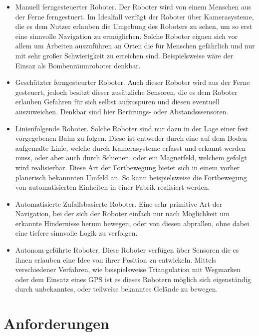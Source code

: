 \begin{itemize}
  \item Manuell ferngesteuerter Roboter. Der Roboter wird von einem Menschen aus der Ferne ferngestuert. Im Idealfall verf\"ugt der Roboter \"uber Kamerasysteme, die es dem Nutzer erlauben die Umgebung des Roboters zu sehen, um so erst eine sinnvolle Navigation zu erm\"oglichen. Solche Roboter eignen sich vor allem um Arbeiten auszuf\"uhren an Orten die f\"ur Menschen gef\"ahrlich und nur mit sehr großer Schwierigkeit zu erreichen sind. Beispielsweise w\"are der Einsaz als Bombenr\"aumroboter denkbar.
  \item Gesch\"utzter ferngesteurter Roboter. Auch dieser Roboter wird aus der Ferne gesteuert, jedoch besitzt dieser zus\"atzliche Sensoren, die es dem Roboter erlauben Gefahren f\"ur sich selbst aufzusp\"uren und diesen eventuell auszuweichen. Denkbar sind hier Ber\"urungs- oder Abstandsssensoren.
  \item Linienfolgende Roboter. Solche Roboter sind nur dazu in der Lage einer fest vorgegebenen Bahn zu folgen. Diese ist entweder durch eine auf dem Boden aufgemalte Linie, welche durch Kamerasysteme erfasst und erkannt werden muss, oder aber auch durch Schienen, oder ein Magnetfeld, welchem gefolgt wird realisierbar. Diese Art der Fortbewegung bietet sich in einem vorher planerisch bekannnten Umfeld an. So kann beispielsweise die Fortbewegung von automatisierten Einheiten in einer Fabrik realisiert werden.
  \item Automatisierte Zufallsbasierte Roboter. Eine sehr primitive Art der Navigation, bei der sich der Roboter einfach nur nach M\"oglichkeit um erkannte Hindernisse herum bewegen, oder von diesen abprallen, ohne dabei eine tiefere sinnvolle Logik zu verfolgen.
  \item Autonom gef\"uhrte Roboter. Diese Roboter verf\"ugen \"uber Sensoren die es ihnen erlauben eine Idee von ihrer Position zu entwickeln. Mittels verschiedener Verfahren, wie beispielsweise Triangulation mit Wegmarken oder dem Einsatz eines GPS ist es dieses Robotern m\"oglich sich eigenst\"andig durch unbekanntes, oder teilweise bekanntes Gel\"ande zu bewegen.
\end{itemize}

\section{Anforderungen}

